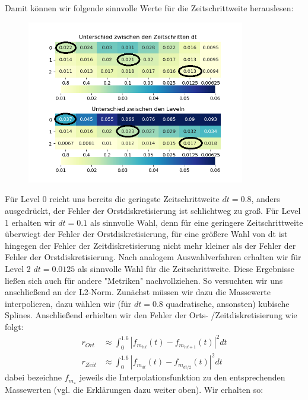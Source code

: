 Damit können wir folgende sinnvolle Werte für die Zeitschrittweite herauslesen:
\begin{figure}[H]
	\centering
	\includegraphics[width=0.85\textwidth]{../Aufgabe31/Maxdiff/Heatmapblub1.png}
\end{figure}
Für Level 0  reicht uns bereits die geringste Zeitschrittweite $dt = 0.8$, anders ausgedrückt, der Fehler der Orstdiskretisierung ist schlichtweg zu groß. Für Level 1 erhalten wir $dt= 0.1$ als sinnvolle Wahl, denn für eine geringere Zeitschrittweite überwiegt der Fehler der Orstdiskretisierung, für eine größere Wahl von dt ist hingegen der Fehler der Zeitdiskretisierung nicht mehr kleiner als der Fehler der Fehler der Orstdiskretisierung.
Nach analogem Auswahlverfahren erhalten wir für Level 2 $dt = 0.0125$ als sinnvolle Wahl für die Zeitschrittweite.
\newline
Diese Ergebnisse ließen sich auch für andere "Metriken" nachvollziehen.
So versuchten wir uns anschließend an der L2-Norm. Zunächst müssen wir dazu die Massewerte interpolieren, dazu wählen wir (für $dt = 0.8$ quadratische, ansonsten) kubische Splines. Anschließend erhielten wir den Fehler der Orts- /Zeitdiskretisierung wie folgt:
\begin{align*}
r_{Ort}  &\approx \int_0^{1.6} |f_{m_{lvl}}(t) - f_{m_{lvl + 1}}  (t) |^2 dt  \\
r_{Zeit}  &\approx \int_0^{1.6}  |f_{m_{dt}}(t) - f_{m_{dt/2} }(t) |^2 dt
\end{align*}
dabei bezeichne $f_{m_{  \star }}$ jeweils die Interpolationsfunktion zu den entsprechenden Massewerten (vgl. die Erklärungen dazu weiter oben).
Wir erhalten so: 
